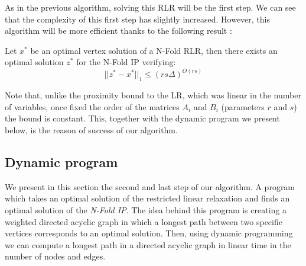 As in the previous algorithm, solving this RLR will be the first step. We can see that the complexity of this first step has slightly increased. However, this algorithm will be more efficient thanks to the following result \cite[Section 3]{EISENBRAND:2020}:

\begin{lemma}\label{NFold_proximity_bound}
    Let $x^*$ be an optimal vertex solution of a N-Fold RLR, then there exists an optimal solution $z^*$ for the N-Fold IP verifying:  
    \begin{equation*}
        ||z^* - x^*||_1 \leq (rs\Delta)^{O(rs)}
    \end{equation*}
\end{lemma}

Note that, unlike the proximity bound to the LR, which was linear in the number of variables, once fixed the order of the matrices $A_i$ and $B_i$ (parameters $r$ and $s$) the bound is constant. This, together with the dynamic program we present below, is the reason of success of our algorithm.

\subsection{Dynamic program}        

We present in this section the second and last step of our algorithm. A program which takes an optimal solution of the restricted linear relaxation and finds an optimal solution of the \emph{N-Fold IP}. The idea behind this program \cite{EISENBRAND:2020} is creating a weighted directed acyclic graph in which a longest path between two specific vertices corresponds to an optimal solution. Then, using dynamic programming we can compute a longest path in a directed acyclic graph in linear time in the number of nodes and edges.

